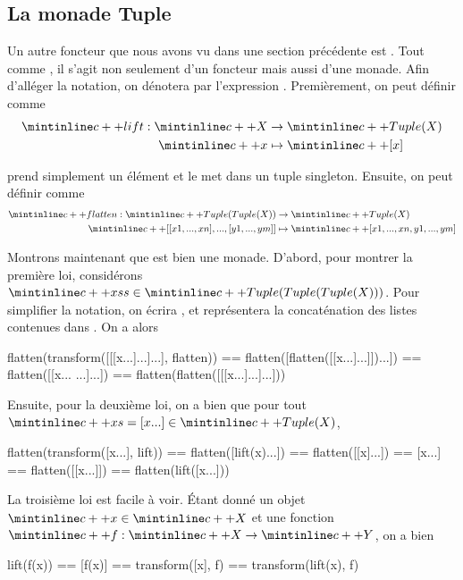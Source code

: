 \subsection{La monade Tuple}
Un autre foncteur que nous avons vu dans une section précédente est .
Tout comme , il s'agit non seulement d'un foncteur mais aussi d'une
monade. Afin d'alléger la notation, on dénotera par \cc{[x1, ..., xn]}
l'expression . Premièrement, on peut définir
 comme
\begin{align*}
    \cc{lift} : \cc{X} &\to \cc{Tuple(X)} \\
                \cc{x} &\mapsto \cc{[x]}  \\
\end{align*}

 prend simplement un élément et le met dans un tuple singleton.
Ensuite, on peut définir  comme
\begin{align*}
    \cc{flatten} : \cc{Tuple(Tuple(X))} &\to \cc{Tuple(X)} \\
                   \cc{[[x1, ..., xn], ..., [y1, ..., ym]]} &\mapsto \cc{[x1, ..., xn, y1, ..., ym]}
\end{align*}

Montrons maintenant que  est bien une monade. D'abord, pour montrer
la première loi, considérons $\cc{xss} \in \cc{Tuple(Tuple(Tuple(X)))}$. Pour
simplifier la notation, on écrira , et 
représentera la concaténation des listes contenues dans \cc{[[x...]...]}.
On a alors
\begin{cpp}
    flatten(transform([[[x...]...]...], flatten))
        == flatten([flatten([[x...]...]])...])
        == flatten([[x... ...]...])
        == flatten(flatten([[[x...]...]...]))
\end{cpp}

Ensuite, pour la deuxième loi, on a bien que pour tout
$\cc{xs = [x...]} \in \cc{Tuple(X)}$,
\begin{cpp}
    flatten(transform([x...], lift)) == flatten([lift(x)...])
                                     == flatten([[x]...])
                                     == [x...]
                                     == flatten([[x...]])
                                     == flatten(lift([x...]))
\end{cpp}

La troisième loi est facile à voir. Étant donné un objet $\cc{x} \in \cc{X}$
et une fonction $\cc{f} : \cc{X} \to \cc{Y}$, on a bien
\begin{cpp}
    lift(f(x)) == [f(x)]
               == transform([x], f)
               == transform(lift(x), f)
\end{cpp}

